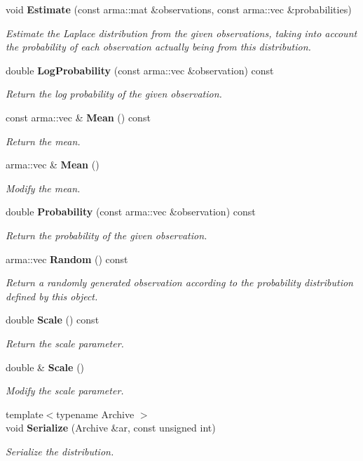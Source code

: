 \begin{DoxyCompactItemize}
void {\bf Estimate} (const arma\+::mat \&observations, const arma\+::vec \&probabilities)
\begin{DoxyCompactList}\small\item\em Estimate the Laplace distribution from the given observations, taking into account the probability of each observation actually being from this distribution. \end{DoxyCompactList}\item 
double {\bf Log\+Probability} (const arma\+::vec \&observation) const 
\begin{DoxyCompactList}\small\item\em Return the log probability of the given observation. \end{DoxyCompactList}\item 
const arma\+::vec \& {\bf Mean} () const 
\begin{DoxyCompactList}\small\item\em Return the mean. \end{DoxyCompactList}\item 
arma\+::vec \& {\bf Mean} ()
\begin{DoxyCompactList}\small\item\em Modify the mean. \end{DoxyCompactList}\item 
double {\bf Probability} (const arma\+::vec \&observation) const 
\begin{DoxyCompactList}\small\item\em Return the probability of the given observation. \end{DoxyCompactList}\item 
arma\+::vec {\bf Random} () const 
\begin{DoxyCompactList}\small\item\em Return a randomly generated observation according to the probability distribution defined by this object. \end{DoxyCompactList}\item 
double {\bf Scale} () const 
\begin{DoxyCompactList}\small\item\em Return the scale parameter. \end{DoxyCompactList}\item 
double \& {\bf Scale} ()
\begin{DoxyCompactList}\small\item\em Modify the scale parameter. \end{DoxyCompactList}\item 
{\footnotesize template$<$typename Archive $>$ }\\void {\bf Serialize} (Archive \&ar, const unsigned int)
\begin{DoxyCompactList}\small\item\em Serialize the distribution. \end{DoxyCompactList}\end{DoxyCompactItemize}
